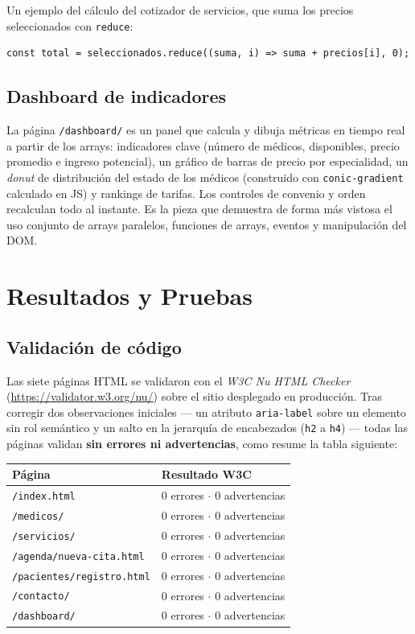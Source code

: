 \documentclass[11pt,a4paper]{article}
\newcommand{\thead}[1]{\textbf{\color{white}#1}}
\newcommand{\hrow}{\rowcolor{navy}}
\begin{document}
Un ejemplo del cálculo del cotizador de servicios, que suma los precios seleccionados con \lstinline|reduce|:

\begin{lstlisting}
const total = seleccionados.reduce((suma, i) => suma + precios[i], 0);
\end{lstlisting}

\subsection{Dashboard de indicadores}
La página \texttt{/dashboard/} es un panel que calcula y dibuja métricas en tiempo real a partir de los arrays: indicadores clave (número de médicos, disponibles, precio promedio e ingreso potencial), un gráfico de barras de precio por especialidad, un \emph{donut} de distribución del estado de los médicos (construido con \lstinline|conic-gradient| calculado en JS) y rankings de tarifas. Los controles de convenio y orden recalculan todo al instante. Es la pieza que demuestra de forma más vistosa el uso conjunto de arrays paralelos, funciones de arrays, eventos y manipulación del DOM.

\section{Resultados y Pruebas}

\subsection{Validación de código}
Las siete páginas HTML se validaron con el \emph{W3C Nu HTML Checker} (\url{https://validator.w3.org/nu/}) sobre el sitio desplegado en producción. Tras corregir dos observaciones iniciales --- un atributo \lstinline|aria-label| sobre un elemento sin rol semántico y un salto en la jerarquía de encabezados (\lstinline|h2| a \lstinline|h4|) --- todas las páginas validan \textbf{sin errores ni advertencias}, como resume la tabla siguiente:

\begin{center}
\begin{tabularx}{\textwidth}{Y l}
\hrow \thead{Página} & \thead{Resultado W3C} \\
\midrule
\texttt{/index.html} & 0 errores $\cdot$ 0 advertencias \\
\texttt{/medicos/} & 0 errores $\cdot$ 0 advertencias \\
\texttt{/servicios/} & 0 errores $\cdot$ 0 advertencias \\
\texttt{/agenda/nueva-cita.html} & 0 errores $\cdot$ 0 advertencias \\
\texttt{/pacientes/registro.html} & 0 errores $\cdot$ 0 advertencias \\
\texttt{/contacto/} & 0 errores $\cdot$ 0 advertencias \\
\texttt{/dashboard/} & 0 errores $\cdot$ 0 advertencias \\
\bottomrule
\end{tabularx}
\end{center}
\end{document}
